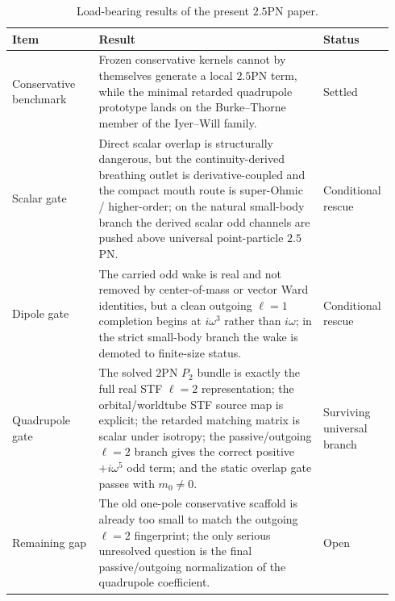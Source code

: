 \documentclass[11pt]{article}
\begin{document}
\begin{table}[t]
  \centering
  \caption{Load-bearing results of the present $2.5$PN paper.}
  \label{tab:executive-ledger-25pn}
  \footnotesize
  \setlength{\tabcolsep}{4pt}
  \renewcommand{\arraystretch}{1.12}
  \begin{tabular}{p{0.22\linewidth}p{0.58\linewidth}p{0.14\linewidth}}
    \hline
    Item & Result & Status \\
    \hline
    Conservative benchmark
    & Frozen conservative kernels cannot by themselves generate a local $2.5$PN
      term, while the minimal retarded quadrupole prototype lands on the
      Burke--Thorne member of the Iyer--Will family.
    & Settled \\

    Scalar gate
    & Direct scalar overlap is structurally dangerous, but the continuity-derived
      breathing outlet is derivative-coupled and the compact mouth route is
      super-Ohmic / higher-order; on the natural small-body branch the derived
      scalar odd channels are pushed above universal point-particle $2.5$PN.
    & Conditional rescue \\

    Dipole gate
    & The carried odd wake is real and not removed by center-of-mass or vector
      Ward identities, but a clean outgoing $\ell=1$ completion begins at
      $i\omega^3$ rather than $i\omega$; in the strict small-body branch the wake
      is demoted to finite-size status.
    & Conditional rescue \\

    Quadrupole gate
    & The solved $2$PN $P_2$ bundle is exactly the full real STF $\ell=2$
      representation; the orbital/worldtube STF source map is explicit; the
      retarded matching matrix is scalar under isotropy; the passive/outgoing
      $\ell=2$ branch gives the correct positive $+i\omega^5$ odd term; and the
      static overlap gate passes with $m_0\neq0$.
    & Surviving universal branch \\

    Remaining gap
    & The old one-pole conservative scaffold is already too small to match the
      outgoing $\ell=2$ fingerprint; the only serious unresolved question is the
      final passive/outgoing normalization of the quadrupole coefficient.
    & Open \\
    \hline
  \end{tabular}
\end{table}
\end{document}
